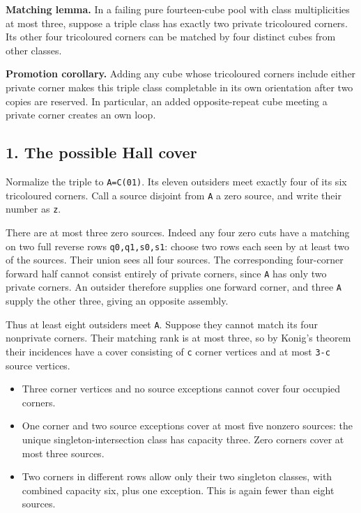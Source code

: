 \documentclass[
  10pt,
]{article}
\providecommand{\tightlist}{%
  \setlength{\itemsep}{0pt}\setlength{\parskip}{0pt}}
\begin{document}
\textbf{Matching lemma.} In a failing pure fourteen-cube pool with class
multiplicities at most three, suppose a triple class has exactly two
private tricoloured corners. Its other four tricoloured corners can be
matched by four distinct cubes from other classes.

\textbf{Promotion corollary.} Adding any cube whose tricoloured corners
include either private corner makes this triple class completable in its
own orientation after two copies are reserved. In particular, an added
opposite-repeat cube meeting a private corner creates an own loop.

\hypertarget{the-possible-hall-cover}{%
\subsection*{1. The possible Hall cover}\label{the-possible-hall-cover}}

Normalize the triple to \texttt{A=C(01)}. Its eleven outsiders meet
exactly four of its six tricoloured corners. Call a source disjoint from
\texttt{A} a zero source, and write their number as \texttt{z}.

There are at most three zero sources. Indeed any four zero cuts have a
matching on two full reverse rows \texttt{q0,q1,s0,s1}: choose two rows
each seen by at least two of the sources. Their union sees all four
sources. The corresponding four-corner forward half cannot consist
entirely of private corners, since \texttt{A} has only two private
corners. An outsider therefore supplies one forward corner, and three
\texttt{A} supply the other three, giving an opposite assembly.

Thus at least eight outsiders meet \texttt{A}. Suppose they cannot match
its four nonprivate corners. Their matching rank is at most three, so by
Konig's theorem their incidences have a cover consisting of \texttt{c}
corner vertices and at most \texttt{3-c} source vertices.

\begin{itemize}
\tightlist
\item
  Three corner vertices and no source exceptions cannot cover four
  occupied corners.
\item
  One corner and two source exceptions cover at most five nonzero
  sources: the unique singleton-intersection class has capacity three.
  Zero corners cover at most three sources.
\item
  Two corners in different rows allow only their two singleton classes,
  with combined capacity six, plus one exception. This is again fewer
  than eight sources.
\end{itemize}
\end{document}
